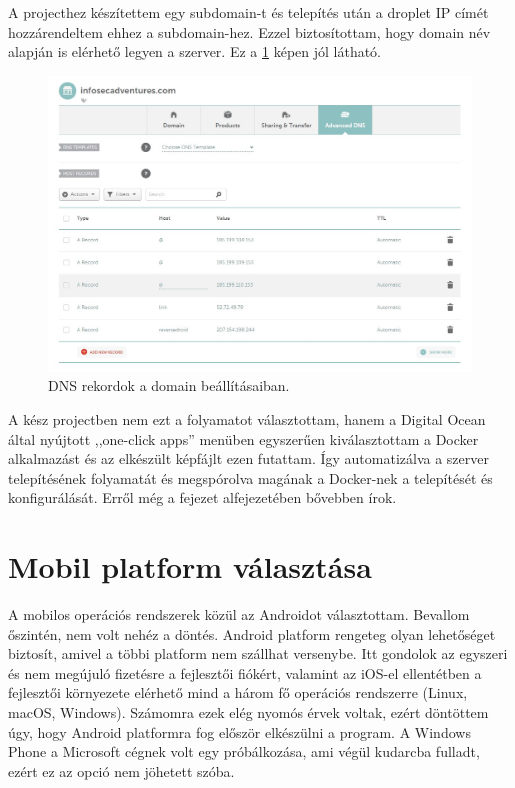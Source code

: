 \documentclass{thesis-ekf}
\theoremstyle{definition}
\theoremstyle{remark}
\begin{document}
A projecthez készítettem egy subdomain-t és telepítés után a droplet IP címét hozzárendeltem ehhez a subdomain-hez.
Ezzel biztosítottam, hogy domain név alapján is elérhető legyen a szerver. Ez a \ref{namecheap} képen jól látható.

\begin{figure}[!h]
	\centering
	\includegraphics[width=15cm]{pictures/namecheap}
	\caption{DNS rekordok a domain beállításaiban.}
	\label{namecheap}
\end{figure}

A kész projectben nem ezt a folyamatot választottam, hanem a Digital Ocean által nyújtott ,,one-click apps'' menüben egyszerűen kiválasztottam a Docker alkalmazást és az elkészült képfájlt ezen futattam. 
Így automatizálva a szerver telepítésének folyamatát és megspórolva magának a Docker-nek a telepítését és konfigurálását.
Erről még a  fejezet  alfejezetében bővebben írok.

\section{Mobil platform választása}

A mobilos operációs rendszerek közül az Androidot választottam. Bevallom őszintén, nem volt nehéz a döntés. 
Android platform rengeteg olyan lehetőséget biztosít, amivel a többi platform nem szállhat versenybe.
Itt gondolok az egyszeri és nem megújuló fizetésre a fejlesztői fiókért, valamint az iOS-el ellentétben a fejlesztői környezete elérhető mind a három fő operációs rendszerre (Linux, macOS, Windows).
Számomra ezek elég nyomós érvek voltak, ezért döntöttem úgy, hogy Android platformra fog először elkészülni a program.
A Windows Phone a Microsoft cégnek volt egy próbálkozása, ami végül kudarcba fulladt, ezért ez az opció nem jöhetett szóba.
\end{document}
